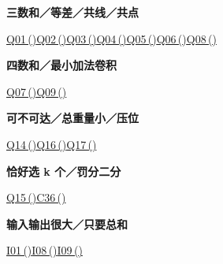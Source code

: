 \documentclass[10pt,a4paper]{article}
\newcommand{\grouphead}[1]{\needspace{7\baselineskip}\par\vspace{7pt}{\large\bfseries #1}\par\vspace{5pt}}
\begin{document}
\grouphead{二次瓶颈与背包}
\begin{minipage}{\linewidth}\textbf{三数和／等差／共线／共点}\par{\fontsize{9.5}{12}\selectfont \hyperref[Q01]{Q01\,(\pageref*{Q01})}\hspace{.5em}\allowbreak \hyperref[Q02]{Q02\,(\pageref*{Q02})}\hspace{.5em}\allowbreak \hyperref[Q03]{Q03\,(\pageref*{Q03})}\hspace{.5em}\allowbreak \hyperref[Q04]{Q04\,(\pageref*{Q04})}\hspace{.5em}\allowbreak \hyperref[Q05]{Q05\,(\pageref*{Q05})}\hspace{.5em}\allowbreak \hyperref[Q06]{Q06\,(\pageref*{Q06})}\hspace{.5em}\allowbreak \hyperref[Q08]{Q08\,(\pageref*{Q08})}}\end{minipage}\par\vspace{5pt}
\begin{minipage}{\linewidth}\textbf{四数和／最小加法卷积}\par{\fontsize{9.5}{12}\selectfont \hyperref[Q07]{Q07\,(\pageref*{Q07})}\hspace{.5em}\allowbreak \hyperref[Q09]{Q09\,(\pageref*{Q09})}}\end{minipage}\par\vspace{5pt}
\begin{minipage}{\linewidth}\textbf{可不可达／总重量小／压位}\par{\fontsize{9.5}{12}\selectfont \hyperref[Q14]{Q14\,(\pageref*{Q14})}\hspace{.5em}\allowbreak \hyperref[Q16]{Q16\,(\pageref*{Q16})}\hspace{.5em}\allowbreak \hyperref[Q17]{Q17\,(\pageref*{Q17})}}\end{minipage}\par\vspace{5pt}
\begin{minipage}{\linewidth}\textbf{恰好选 k 个／罚分二分}\par{\fontsize{9.5}{12}\selectfont \hyperref[Q15]{Q15\,(\pageref*{Q15})}\hspace{.5em}\allowbreak \hyperref[C36]{C36\,(\pageref*{C36})}}\end{minipage}\par\vspace{5pt}
\grouphead{信息量与状态}
\begin{minipage}{\linewidth}\textbf{输入输出很大／只要总和}\par{\fontsize{9.5}{12}\selectfont \hyperref[I01]{I01\,(\pageref*{I01})}\hspace{.5em}\allowbreak \hyperref[I08]{I08\,(\pageref*{I08})}\hspace{.5em}\allowbreak \hyperref[I09]{I09\,(\pageref*{I09})}}\end{minipage}\par\vspace{5pt}
\end{document}
